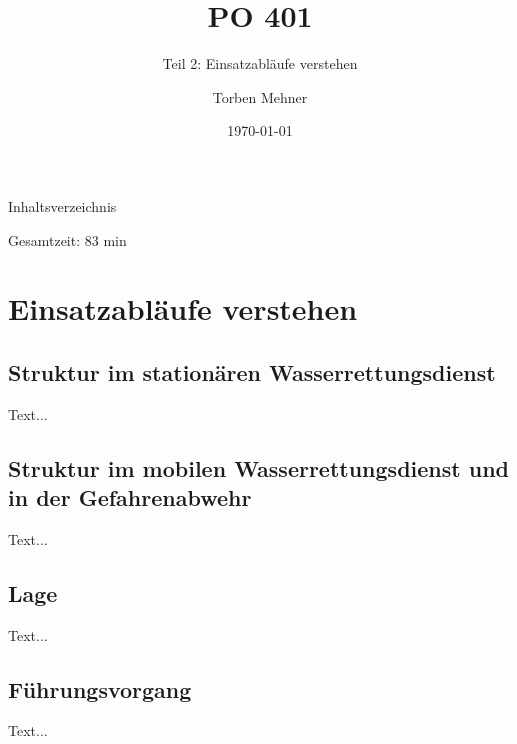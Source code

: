 \documentclass[notes]{beamer} %
\title{PO 401}
\subtitle{Teil 2: Einsatzabläufe verstehen}
\author{Torben Mehner}
\institute{Bezirk Karlsruhe}
\date{\today}
\begin{document}
	
	
	\begin{frame}{Inhaltsverzeichnis}
		
		\tableofcontents[ 
		sectionstyle=hide, 
		subsectionstyle=show,]
		
		Gesamtzeit: 83 min
		
	\end{frame}		
	
	\section{Einsatzabläufe verstehen}
	\subsection{Struktur im stationären Wasserrettungsdienst}
	\begin{frame}{\subsecname}
		
		Text...
		
	\end{frame}

	\subsection{Struktur im mobilen Wasserrettungsdienst und in der	Gefahrenabwehr}
	\begin{frame}{\subsecname}
		
		Text...
		
	\end{frame}
	
	\subsection{Lage}
	\begin{frame}{\subsecname}
		
		Text...
		
	\end{frame}

	\subsection{Führungsvorgang}
	\begin{frame}{\subsecname}
		
		Text...
		
	\end{frame}
\end{document}
